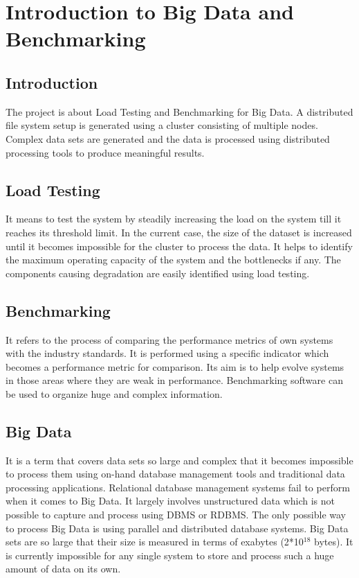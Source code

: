 \documentclass[12pt]{book}
\begin{document}
\setcounter{page}{1}

\listoffigures
\listoftables

\tableofcontents

\vfill

\pagebreak
\cleardoublepage

\setcounter{page}{1}

\chapter{Introduction to Big Data and Benchmarking}
\section{Introduction}
The project is about Load Testing and Benchmarking for Big Data. A distributed file system setup is generated using a cluster consisting of 
multiple nodes. Complex data sets are generated and the data is processed using distributed processing tools to produce meaningful results.
\\\noindent
\section{Load Testing}
It means to test the system by steadily increasing the load on the system till it reaches its threshold limit. In the current case, 
the size of the dataset is increased until it becomes impossible for the cluster to process the data. It helps to identify the maximum 
operating capacity of the system and the bottlenecks if any. The components causing degradation are easily identified using load testing.
\\\noindent
\section{Benchmarking}
It refers to the process of comparing the performance metrics of own systems with the industry standards. It is performed using 
a specific indicator which becomes a performance metric for comparison. Its aim is to help evolve systems in those areas where they are
weak in performance. Benchmarking software can be used to organize huge and complex information.
\\\noindent
\section{Big Data}
It is a term that covers data sets so large and complex that it becomes impossible to process them using on-hand database management tools and 
traditional data processing applications. Relational database management systems fail to perform when it comes to Big Data. It largely involves
unstructured data which is not possible to capture and process using DBMS or RDBMS. The only possible way to process Big Data is using 
parallel and distributed database systems. Big Data sets are so large that their size is measured in terms of exabytes (2*10$^{18}$ bytes).
It is currently impossible for any single system to store and process such a huge amount of data on its own.
\end{document}
